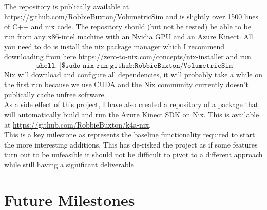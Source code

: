 The repository is publically available at \url{https://github.com/RobbieBuxton/VolumetricSim} and is slightly over 1500 lines of C++ and nix code. The repository should (but not be tested) be able to be run from any x86-intel machine with an Nvidia GPU and an Azure Kinect. All you need to do is install the nix package manager which I recommend downloading from here \url{https://zero-to-nix.com/concepts/nix-installer} and run 
\[\texttt{[shell:~]\$ sudo nix run github:RobbieBuxton/VolumetricSim}\]
 Nix will download and configure all dependencies, it will probably take a while on the first run because we use CUDA and the Nix community currently doesn't publically cache unfree software. \\

As a side effect of this project, I have also created a repository of a package that will automatically build and run the Azure Kinect SDK on Nix. This is available at \url{https://github.com/RobbieBuxton/k4a-nix}. \\

This is a key milestone as represents the baseline functionality required to start the more interesting additions. This has de-risked the project as if some features turn out to be unfeasible it should not be difficult to pivot to a different approach while still having a significant deliverable.

\section{Future Milestones}
